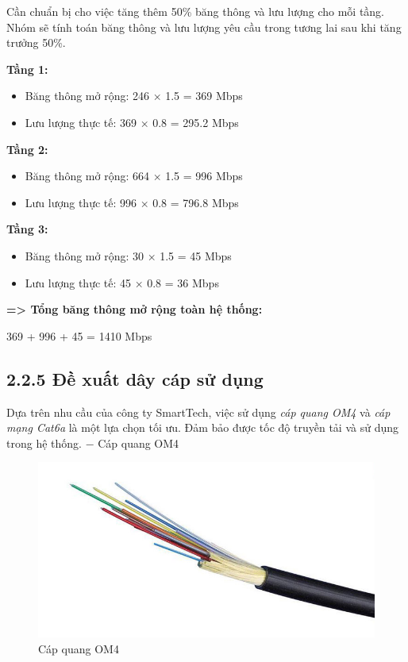 Cần chuẩn bị cho việc tăng thêm 50\% băng thông và lưu lượng cho mỗi tầng. Nhóm sẽ tính toán băng thông và lưu lượng yêu cầu trong tương lai sau khi tăng trưởng 50\%.

\textbf{Tầng 1:}
\begin{itemize}[left=2cm]
    \item Băng thông mở rộng: 246 × 1.5 = 369 Mbps
    \item Lưu lượng thực tế: 369 × 0.8 = 295.2 Mbps
\end{itemize}

\textbf{Tầng 2:}
\begin{itemize}[left=2cm]
    \item Băng thông mở rộng: 664 × 1.5 = 996 Mbps
    \item Lưu lượng thực tế: 996 × 0.8 = 796.8 Mbps
\end{itemize}

\textbf{Tầng 3:}
\begin{itemize}[left=2cm]
    \item Băng thông mở rộng: 30 × 1.5 = 45 Mbps
    \item Lưu lượng thực tế: 45 × 0.8 = 36 Mbps
\end{itemize}

\textbf{=> Tổng băng thông mở rộng toàn hệ thống: }
\begin{center} 
369 + 996 + 45 = 1410 Mbps
\end{center}

\subsection*{2.2.5 Đề xuất dây cáp sử dụng}

Dựa trên nhu cầu của công ty SmartTech, việc sử dụng \textit{cáp quang OM4} và \textit{cáp mạng Cat6a} là một lựa chọn tối ưu. Đảm bảo được tốc độ truyền tải và sử dụng trong hệ thống.
\newpage
$-$ Cáp quang OM4
\begin{figure}[htbp]
    \centering
    \includegraphics[width=0.6\linewidth]{img/om4.jpeg}
    \caption{Cáp quang OM4}
\end{figure}

